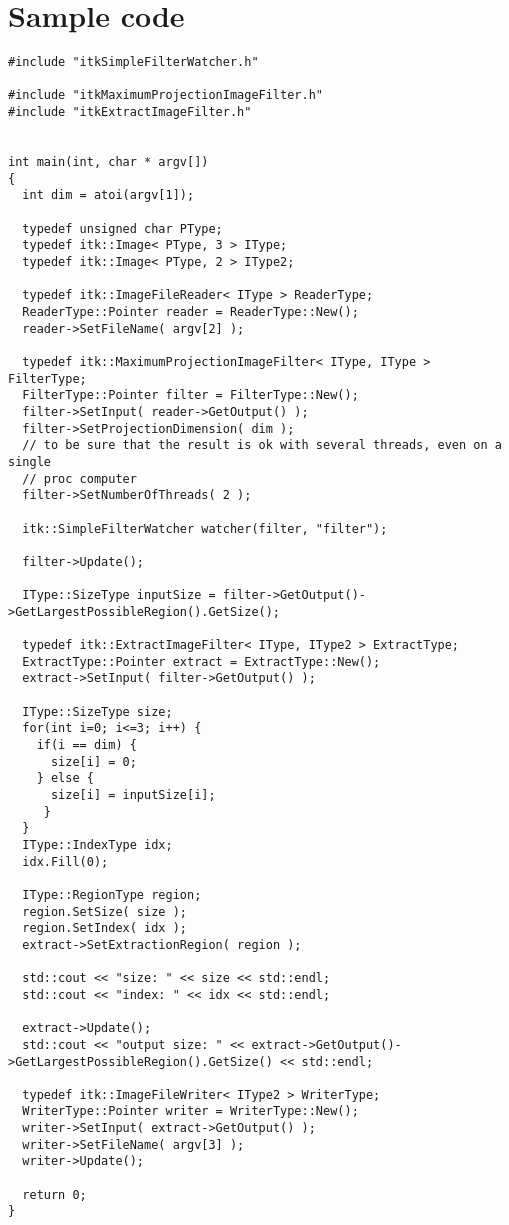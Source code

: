 \documentclass{InsightArticle}
\begin{document}
\section{Sample code}

\small \begin{verbatim}
#include "itkSimpleFilterWatcher.h"

#include "itkMaximumProjectionImageFilter.h"
#include "itkExtractImageFilter.h"


int main(int, char * argv[])
{
  int dim = atoi(argv[1]);

  typedef unsigned char PType;
  typedef itk::Image< PType, 3 > IType;
  typedef itk::Image< PType, 2 > IType2;

  typedef itk::ImageFileReader< IType > ReaderType;
  ReaderType::Pointer reader = ReaderType::New();
  reader->SetFileName( argv[2] );

  typedef itk::MaximumProjectionImageFilter< IType, IType > FilterType;
  FilterType::Pointer filter = FilterType::New();
  filter->SetInput( reader->GetOutput() );
  filter->SetProjectionDimension( dim );
  // to be sure that the result is ok with several threads, even on a single
  // proc computer
  filter->SetNumberOfThreads( 2 );

  itk::SimpleFilterWatcher watcher(filter, "filter");

  filter->Update();

  IType::SizeType inputSize = filter->GetOutput()->GetLargestPossibleRegion().GetSize();

  typedef itk::ExtractImageFilter< IType, IType2 > ExtractType;
  ExtractType::Pointer extract = ExtractType::New();
  extract->SetInput( filter->GetOutput() );

  IType::SizeType size;
  for(int i=0; i<=3; i++) {
    if(i == dim) {
      size[i] = 0;
    } else {
      size[i] = inputSize[i];
     }
  }
  IType::IndexType idx;
  idx.Fill(0);

  IType::RegionType region;
  region.SetSize( size );
  region.SetIndex( idx );
  extract->SetExtractionRegion( region );

  std::cout << "size: " << size << std::endl;
  std::cout << "index: " << idx << std::endl;

  extract->Update();
  std::cout << "output size: " << extract->GetOutput()->GetLargestPossibleRegion().GetSize() << std::endl;

  typedef itk::ImageFileWriter< IType2 > WriterType;
  WriterType::Pointer writer = WriterType::New();
  writer->SetInput( extract->GetOutput() );
  writer->SetFileName( argv[3] );
  writer->Update();

  return 0;
}
\end{verbatim} \normalsize
\end{document}
